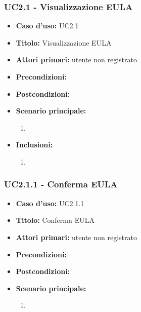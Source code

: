\documentclass[casi-duso]{subfiles}
\begin{document}
\subsubsection{UC2.1 - Visualizzazione EULA}
\label{subsub:uc2.1utente}
\begin{itemize}
  \item \textbf{Caso d’uso:} UC2.1 
  \item \textbf{Titolo:} Visualizzazione EULA
  \item \textbf{Attori primari:} utente non registrato
  \item \textbf{Precondizioni:} 
  \item \textbf{Postcondizioni:}  
  \item \textbf{Scenario principale:} 
  \begin{enumerate}
    \item 
  \end{enumerate}  
  \item \textbf{Inclusioni:} 
  \begin{enumerate}
    \item 
  \end{enumerate}   
\end{itemize}

\subsubsection{UC2.1.1 - Conferma EULA}
\label{subsub:uc2.1.1utente}
\begin{itemize}
  \item \textbf{Caso d’uso:} UC2.1.1 
  \item \textbf{Titolo:} Conferma EULA
  \item \textbf{Attori primari:} utente non registrato
  \item \textbf{Precondizioni:} 
  \item \textbf{Postcondizioni:}  
  \item \textbf{Scenario principale:} 
  \begin{enumerate}
    \item 
  \end{enumerate}    
\end{itemize}

\end{document}
